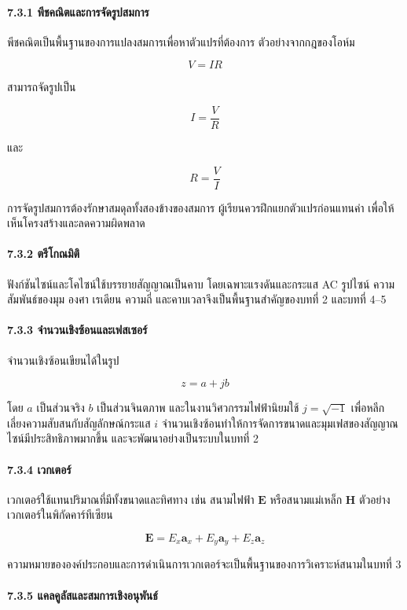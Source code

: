 \paragraph{7.3.1 พีชคณิตและการจัดรูปสมการ}

พีชคณิตเป็นพื้นฐานของการแปลงสมการเพื่อหาตัวแปรที่ต้องการ ตัวอย่างจากกฎของโอห์ม

\[
V = IR
\]

สามารถจัดรูปเป็น

\[
I = \frac{V}{R}
\]

และ

\[
R = \frac{V}{I}
\]

การจัดรูปสมการต้องรักษาสมดุลทั้งสองข้างของสมการ ผู้เรียนควรฝึกแยกตัวแปรก่อนแทนค่า เพื่อให้เห็นโครงสร้างและลดความผิดพลาด

\paragraph{7.3.2 ตรีโกณมิติ}

ฟังก์ชันไซน์และโคไซน์ใช้บรรยายสัญญาณเป็นคาบ โดยเฉพาะแรงดันและกระแส AC รูปไซน์ ความสัมพันธ์ของมุม องศา เรเดียน ความถี่ และคาบเวลาจึงเป็นพื้นฐานสำคัญของบทที่ 2 และบทที่ 4–5

\paragraph{7.3.3 จำนวนเชิงซ้อนและเฟสเซอร์}

จำนวนเชิงซ้อนเขียนได้ในรูป

\[
z = a + jb
\]

โดย $a$ เป็นส่วนจริง $b$ เป็นส่วนจินตภาพ และในงานวิศวกรรมไฟฟ้านิยมใช้ $j=\sqrt{-1}$ เพื่อหลีกเลี่ยงความสับสนกับสัญลักษณ์กระแส $i$ จำนวนเชิงซ้อนทำให้การจัดการขนาดและมุมเฟสของสัญญาณไซน์มีประสิทธิภาพมากขึ้น และจะพัฒนาอย่างเป็นระบบในบทที่ 2

\paragraph{7.3.4 เวกเตอร์}

เวกเตอร์ใช้แทนปริมาณที่มีทั้งขนาดและทิศทาง เช่น สนามไฟฟ้า $\mathbf{E}$ หรือสนามแม่เหล็ก $\mathbf{H}$ ตัวอย่างเวกเตอร์ในพิกัดคาร์ทีเซียน

\[
\mathbf{E}=E_x\mathbf{a}_x+E_y\mathbf{a}_y+E_z\mathbf{a}_z
\]

ความหมายขององค์ประกอบและการดำเนินการเวกเตอร์จะเป็นพื้นฐานของการวิเคราะห์สนามในบทที่ 3

\paragraph{7.3.5 แคลคูลัสและสมการเชิงอนุพันธ์}

